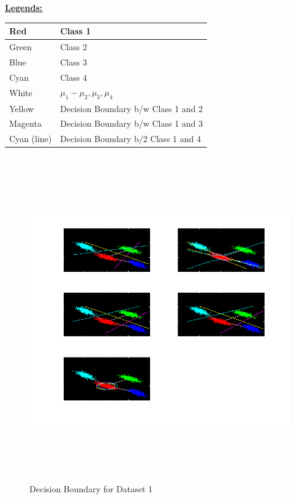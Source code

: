 \documentclass[11pt,a4paper]{article}
\begin{document}
\underline{\textbf{Legends:}}\\
\begin{tabular}{| l | l |}
\hline 
Red & Class 1 \\ \hline 
Green & Class 2\\ \hline 
Blue & Class 3\\ \hline 
Cyan & Class 4\\ \hline 
White & $\mu_1 - \mu_2, \mu_3, \mu_4$\\ \hline 
Yellow & Decision Boundary b/w Class 1 and 2 \\ \hline 
Magenta & Decision Boundary b/w Class 1 and 3 \\ \hline 
Cyan (line) & Decision Boundary b/2 Class 1 and 4 \\
\hline 
\end{tabular}

\begin{figure}[H]
	\includegraphics[height=14cm]{Figures/LS_DB.png}
	\caption{Decision Boundary for Dataset 1}
\end{figure}
\end{document}
